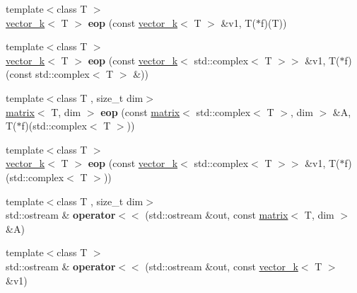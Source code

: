 \begin{DoxyCompactItemize}
\item 
\hypertarget{namespacekeycpp_a48fb1c8a89210ed78554ecd0bed92a59}{{\footnotesize template$<$class T $>$ }\\\hyperlink{classkeycpp_1_1vector__k}{vector\-\_\-k}$<$ T $>$ {\bfseries eop} (const \hyperlink{classkeycpp_1_1vector__k}{vector\-\_\-k}$<$ T $>$ \&v1, T($\ast$f)(T))}\label{namespacekeycpp_a48fb1c8a89210ed78554ecd0bed92a59}

\item 
\hypertarget{namespacekeycpp_afc7610588aa92335352b2796ebdd359d}{{\footnotesize template$<$class T $>$ }\\\hyperlink{classkeycpp_1_1vector__k}{vector\-\_\-k}$<$ T $>$ {\bfseries eop} (const \hyperlink{classkeycpp_1_1vector__k}{vector\-\_\-k}$<$ std\-::complex$<$ T $>$$>$ \&v1, T($\ast$f)(const std\-::complex$<$ T $>$ \&))}\label{namespacekeycpp_afc7610588aa92335352b2796ebdd359d}

\item 
\hypertarget{namespacekeycpp_a2309a6456fab18ec68a436f269d32d8f}{{\footnotesize template$<$class T , size\-\_\-t dim$>$ }\\\hyperlink{classkeycpp_1_1matrix}{matrix}$<$ T, dim $>$ {\bfseries eop} (const \hyperlink{classkeycpp_1_1matrix}{matrix}$<$ std\-::complex$<$ T $>$, dim $>$ \&A, T($\ast$f)(std\-::complex$<$ T $>$))}\label{namespacekeycpp_a2309a6456fab18ec68a436f269d32d8f}

\item 
\hypertarget{namespacekeycpp_a31115adc10089fbbc732d59362890af2}{{\footnotesize template$<$class T $>$ }\\\hyperlink{classkeycpp_1_1vector__k}{vector\-\_\-k}$<$ T $>$ {\bfseries eop} (const \hyperlink{classkeycpp_1_1vector__k}{vector\-\_\-k}$<$ std\-::complex$<$ T $>$$>$ \&v1, T($\ast$f)(std\-::complex$<$ T $>$))}\label{namespacekeycpp_a31115adc10089fbbc732d59362890af2}

\item 
\hypertarget{namespacekeycpp_abdc9a2ec3fa602bd1bad9cd9ea14038e}{{\footnotesize template$<$class T , size\-\_\-t dim$>$ }\\std\-::ostream \& {\bfseries operator$<$$<$} (std\-::ostream \&out, const \hyperlink{classkeycpp_1_1matrix}{matrix}$<$ T, dim $>$ \&A)}\label{namespacekeycpp_abdc9a2ec3fa602bd1bad9cd9ea14038e}

\item 
\hypertarget{namespacekeycpp_a86f8946c126102b4467b70da16766b7a}{{\footnotesize template$<$class T $>$ }\\std\-::ostream \& {\bfseries operator$<$$<$} (std\-::ostream \&out, const \hyperlink{classkeycpp_1_1vector__k}{vector\-\_\-k}$<$ T $>$ \&v1)}\label{namespacekeycpp_a86f8946c126102b4467b70da16766b7a}


\end{DoxyCompactItemize}
